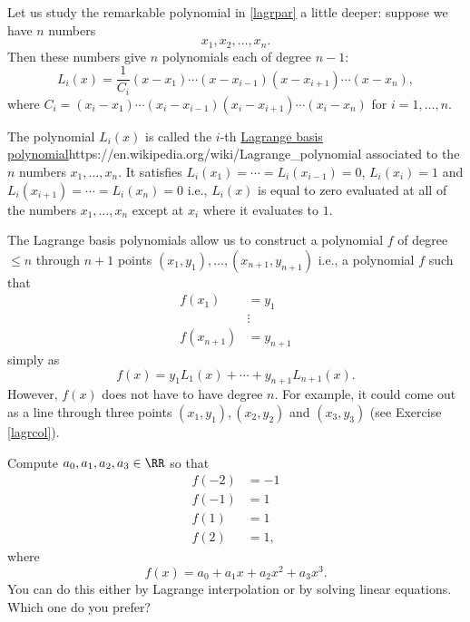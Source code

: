 \documentclass{article}
\begin{document}
Let us study the remarkable polynomial in \eqref{lagrpar} a little deeper: suppose we have $n$ numbers
\begin{equation}\label{Lpts}
x_1, x_2, \dots, x_n.
\end{equation}
Then these numbers give $n$ polynomials each of degree $n-1$:
$$
L_i(x) = \frac{1}{C_i} (x-x_1) \cdots (x-x_{i-1})(x-x_{i+1}) \cdots (x - x_n),
$$
where
$C_i = (x_i-x_1) \cdots (x_i-x_{i-1})(x_i-x_{i+1}) \cdots (x_i - x_n)$ for
$i = 1, \dots, n$.

The polynomial $L_i(x)$ is called the $i$-th
\url{Lagrange basis polynomial}{https://en.wikipedia.org/wiki/Lagrange_polynomial}
associated to the $n$ numbers $x_1, \dots, x_n$.
It satisfies
$L_i(x_1) = \cdots = L_i(x_{i-1}) = 0$, $L_i(x_i) = 1$ and
$L_i(x_{i+1}) = \cdots = L_i(x_n) = 0$ i.e., $L_i(x)$ is equal to zero
evaluated at all of the numbers $x_1, \dots, x_n$ except at $x_i$
where it evaluates to $1$.


The Lagrange basis polynomials allow us to construct a polynomial $f$ of degree $\leq n$ through
$n+1$ points $(x_1, y_1), \dots, (x_{n+1}, y_{n+1})$ i.e., a polynomial $f$ such that
\begin{align*}
  f(x_1) &= y_1\\
         &\vdots\\
  f(x_{n+1}) &= y_{n+1}
\end{align*}
simply as
$$
f(x) = y_1 L_1(x) + \cdots + y_{n+1} L_{n+1}(x).
$$
However, $f(x)$ does not have to have degree $n$. For example, it could come out as a line through
three points $(x_1, y_1), (x_2, y_2)$ and $(x_3, y_3)$ (see Exercise \ref{lagrcol}).

\beginshex
Compute $a_0, a_1, a_2, a_3\in \RR$ so that
\begin{align*}
f(-2) &= -1\\
f(-1) &= 1\\
f(1) &= 1\\
f(2) &= 1,
\end{align*}
where
$$
f(x) = a_0 + a_1 x + a_2 x^2 + a_3 x^3.
$$
You can do this either by Lagrange interpolation or by solving linear equations. Which one
do you prefer?
\endshex
\end{document}
